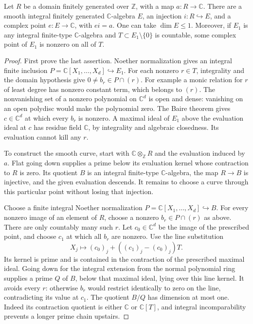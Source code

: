\begin{srlemma}
\label{lem:ftb-countable-smooth-through}
Let \(R\) be a domain finitely generated over \(\mathbb Z\), with
a map \(a:R\to\mathbb C\).
There are a smooth integral finitely generated
\(\mathbb C\)-algebra \(E\), an injection \(i:R\hookrightarrow E\),
and a complex point \(e:E\to\mathbb C\), with \(ei=a\).
One can take \(\dim E\le1\).
Moreover, if \(E_1\) is any integral finite-type
\(\mathbb C\)-algebra and \(T\subset E_1\setminus\{0\}\) is
countable, some complex point of \(E_1\) is nonzero on all of \(T\).
\end{srlemma}
\begin{proof}
First prove the last assertion.
Noether normalization gives an integral finite inclusion
\(P=\mathbb C[X_1,\ldots,X_d]\hookrightarrow E_1\).
For each nonzero \(r\in T\), integrality and the domain
hypothesis give \(0\ne b_r\in P\cap(r)\).
For example a monic relation for \(r\) of least degree has
nonzero constant term, which belongs to \((r)\).
The nonvanishing set of a nonzero polynomial on \(\mathbb C^d\)
is open and dense: vanishing on an open polydisc would make
the polynomial zero.
The Baire theorem gives \(c\in\mathbb C^d\) at which every
\(b_r\) is nonzero.
A maximal ideal of \(E_1\) above the evaluation ideal at \(c\)
has residue field \(\mathbb C\), by integrality and algebraic
closedness.  Its evaluation cannot kill any \(r\).

To construct the smooth curve, start with
\(\mathbb C\otimes_{\mathbb Z}R\) and the evaluation induced by \(a\).
Flat going down supplies a prime below its evaluation kernel
whose contraction to \(R\) is zero.
Its quotient \(B\) is an integral finite-type
\(\mathbb C\)-algebra, the map \(R\to B\) is injective, and the
given evaluation descends.
It remains to choose a curve through this particular point
without losing that injection.

Choose a finite integral Noether normalization
\(P=\mathbb C[X_1,\ldots,X_d]\hookrightarrow B\).
For every nonzero image of an element of \(R\), choose a
nonzero \(b_r\in P\cap(r)\) as above.
There are only countably many such \(r\).
Let \(c_0\in\mathbb C^d\) be the image of the prescribed point,
and choose \(c_1\) at which all \(b_r\) are nonzero.
Use the line substitution
\[
                        X_j\longmapsto (c_0)_j+
                                      ((c_1)_j-(c_0)_j)T.
 \tag{S2}\label{eq:ftb-line-substitution}
\]
Its kernel is prime and is contained in the contraction of
the prescribed maximal ideal.
Going down for the integral extension from the normal
polynomial ring supplies a prime \(Q\) of \(B\), below that
maximal ideal, lying over this line kernel.
It avoids every \(r\): otherwise \(b_r\) would restrict
identically to zero on the line, contradicting its value
at \(c_1\).
The quotient \(B/Q\) has dimension at most one.
Indeed its contraction quotient is either \(\mathbb C\)
or \(\mathbb C[T]\), and integral incomparability prevents
a longer prime chain upstairs.


\end{proof}
